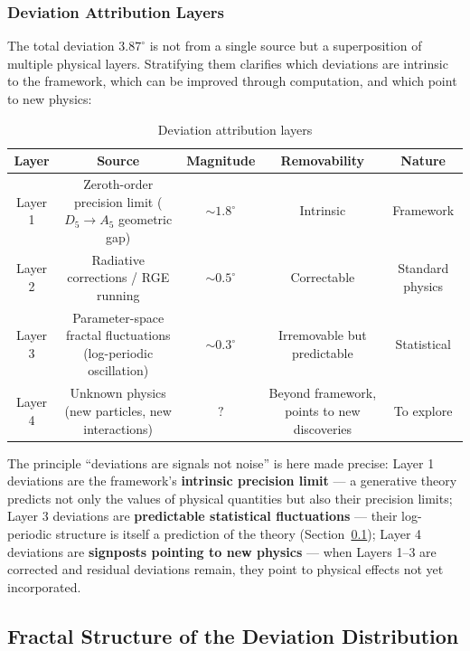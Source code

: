 \subsubsection{Deviation Attribution Layers}
\label{subsubsec:deviation_layers_en}

The total deviation $3.87^\circ$ is not from a single source but a superposition of multiple physical layers. Stratifying them clarifies which deviations are intrinsic to the framework, which can be improved through computation, and which point to new physics:

\begin{table}[htbp]
\centering
\caption{Deviation attribution layers}
\label{tab:deviation_layers_en}
\begin{tabular}{ccccc}
\hline
Layer & Source & Magnitude & Removability & Nature \\
\hline
Layer 1 & Zeroth-order precision limit ($D_5 \to A_5$ geometric gap) & $\sim 1.8^\circ$ & Intrinsic & Framework \\
Layer 2 & Radiative corrections / RGE running & $\sim 0.5^\circ$ & Correctable & Standard physics \\
Layer 3 & Parameter-space fractal fluctuations (log-periodic oscillation) & $\sim 0.3^\circ$ & Irremovable but predictable & Statistical \\
Layer 4 & Unknown physics (new particles, new interactions) & $?$ & Beyond framework, points to new discoveries & To explore \\
\hline
\end{tabular}
\end{table}

The principle ``deviations are signals not noise'' is here made precise: Layer 1 deviations are the framework's \textbf{intrinsic precision limit} --- a generative theory predicts not only the values of physical quantities but also their precision limits; Layer 3 deviations are \textbf{predictable statistical fluctuations} --- their log-periodic structure is itself a prediction of the theory (Section~\ref{subsec:deviation_fractal}); Layer 4 deviations are \textbf{signposts pointing to new physics} --- when Layers 1--3 are corrected and residual deviations remain, they point to physical effects not yet incorporated.

\subsection{Fractal Structure of the Deviation Distribution}
\label{subsec:deviation_fractal}

